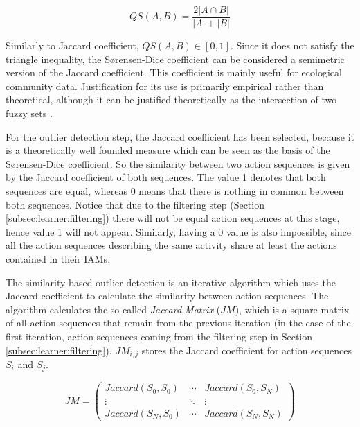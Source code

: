 \begin{equation}
 QS(A, B) = \frac{2 |A \cap B|}{|A| + |B|}
\end{equation}

Similarly to Jaccard coefficient, $QS(A, B) \in [0, 1]$. Since it does not satisfy the triangle inequality, the S{\o}rensen-Dice coefficient can be considered a semimetric version of the Jaccard coefficient. This coefficient is mainly useful for ecological community data. Justification for its use is primarily empirical rather than theoretical, although it can be justified theoretically as the intersection of two fuzzy sets \cite{Roberts1986}. 

For the outlier detection step, the Jaccard coefficient has been selected, because it is a theoretically well founded measure which can be seen as the basis of the S{\o}rensen-Dice coefficient. So the similarity between two action sequences is given by the Jaccard coefficient of both sequences. The value 1 denotes that both sequences are equal, whereas 0 means that there is nothing in common between both sequences. Notice that due to the filtering step (Section \ref{subsec:learner:filtering}) there will not be equal action sequences at this stage, hence value 1 will not appear. Similarly, having a 0 value is also impossible, since all the action sequences describing the same activity share at least the actions contained in their IAMs. 

The similarity-based outlier detection is an iterative algorithm which uses the Jaccard coefficient to calculate the similarity between action sequences. The algorithm calculates the so called \textit{Jaccard Matrix} ($JM$), which is a square matrix of all action sequences that remain from the previous iteration (in the case of the first iteration, action sequences coming from the filtering step in Section \ref{subsec:learner:filtering}). $JM_{i, j}$ stores the Jaccard coefficient for action sequences $S_i$ and $S_j$. 

\begin{equation}
JM = \left(
\begin{array}{ccc}
 Jaccard(S_0, S_0) & \cdots & Jaccard(S_0,S_N) \\
 \vdots & \ddots & \vdots \\
 Jaccard(S_N,S_0) & \cdots & Jaccard(S_N,S_N) 
\end{array}
\right)
\end{equation}

